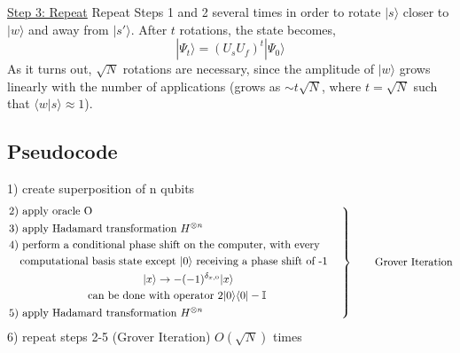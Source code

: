 \documentclass[11pt]{article} %
\begin{document}
\underline{Step 3: Repeat}
\newline
Repeat Steps 1 and 2 several times in order to rotate $|s\rangle$ closer to $|w\rangle$
and away from $|s'\rangle$. After $t$ rotations, the state becomes,
\begin{equation*}
    |\Psi_t\rangle=(U_sU_f)^t|\Psi_0\rangle
\end{equation*}
As it turns out, $\sqrt{N}$ rotations are necessary, since the amplitude of $|w\rangle$ grows linearly with the number of applications (grows as $\sim t\sqrt{N}$, where $t=\sqrt{N}$ such that $\langle w|s\rangle\approx 1$).

\subsection{Pseudocode}
1) create superposition of n qubits
\begin{equation*}
    \left.
    \begin{aligned}
        &\text{2) apply oracle O} \\
        &\text{3) apply Hadamard transformation } H^{\otimes n} \\
        &\text{4) perform a conditional phase shift on the computer, with every}\qquad\\
        &\quad\text{computational basis state except $|0\rangle$ receiving a phase shift of -1} \\
        & \hspace{1.7in} |x\rangle\rightarrow -(-1)^{\delta_{x,0}}|x\rangle \\
        & \hspace{1in}\text{can be done with operator } 2|0\rangle\langle 0| - \mathbb{I}\\
        &\text{5) apply Hadamard transformation } H^{\otimes n} \\
    \end{aligned}
    \right\}
    \qquad
    \text{Grover Iteration}
\end{equation*}
6) repeat steps 2-5 (Grover Iteration) $O(\sqrt{N})$ times
\end{document}
